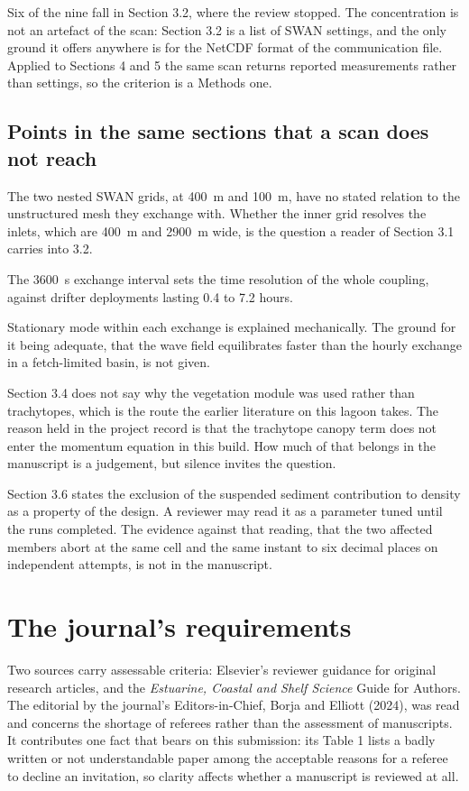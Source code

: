 \documentclass[11pt]{article}
\begin{document}
Six of the nine fall in Section 3.2, where the review stopped. The
concentration is not an artefact of the scan: Section 3.2 is a list of SWAN
settings, and the only ground it offers anywhere is for the NetCDF format of
the communication file. Applied to Sections 4 and 5 the same scan returns
reported measurements rather than settings, so the criterion is a Methods one.

\subsection{Points in the same sections that a scan does not reach}

The two nested SWAN grids, at 400~m and 100~m, have no stated relation to the
unstructured mesh they exchange with. Whether the inner grid resolves the
inlets, which are 400~m and 2900~m wide, is the question a reader of Section
3.1 carries into 3.2.

The 3600~s exchange interval sets the time resolution of the whole coupling,
against drifter deployments lasting 0.4 to 7.2 hours.

Stationary mode within each exchange is explained mechanically. The ground for
it being adequate, that the wave field equilibrates faster than the hourly
exchange in a fetch-limited basin, is not given.

Section 3.4 does not say why the vegetation module was used rather than
trachytopes, which is the route the earlier literature on this lagoon takes.
The reason held in the project record is that the trachytope canopy term does
not enter the momentum equation in this build. How much of that belongs in the
manuscript is a judgement, but silence invites the question.

Section 3.6 states the exclusion of the suspended sediment contribution to
density as a property of the design. A reviewer may read it as a parameter
tuned until the runs completed. The evidence against that reading, that the two
affected members abort at the same cell and the same instant to six decimal
places on independent attempts, is not in the manuscript.

\section{The journal's requirements}

Two sources carry assessable criteria: Elsevier's reviewer guidance for
original research articles, and the \textit{Estuarine, Coastal and Shelf
Science} Guide for Authors. The editorial by the journal's Editors-in-Chief,
Borja and Elliott (2024), was read and concerns the shortage of referees rather
than the assessment of manuscripts. It contributes one fact that bears on this
submission: its Table 1 lists a badly written or not understandable paper among
the acceptable reasons for a referee to decline an invitation, so clarity
affects whether a manuscript is reviewed at all.
\end{document}
